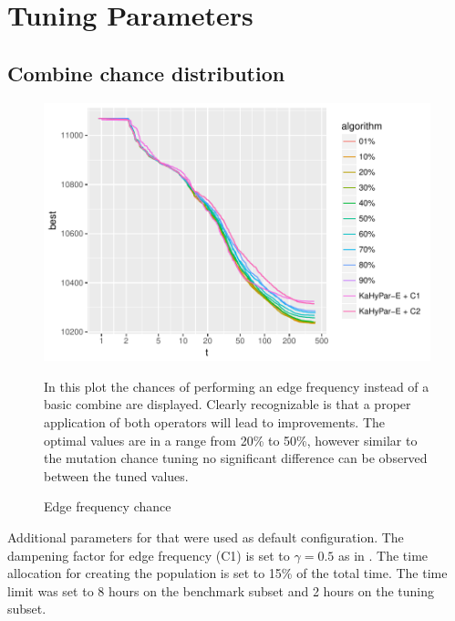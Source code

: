 \documentclass[a4paper,12pt,titlepage, BCOR7mm,headsepline]{scrbook}
\numberwithin{equation}{section}
\begin{document}


\section{Tuning Parameters}

\subsection{Combine chance distribution}
\begin{figure}[H]
\caption{Edge frequency chance}
\begin{center}
\includegraphics{bachelorarbeit-edgefrequencytuning}
\end{center}
In this plot the chances of performing an edge frequency instead of a basic combine are displayed. Clearly recognizable is that a proper application of both operators will lead to improvements. The optimal values are in a range from 20\% to 50\%, however similar to the mutation chance tuning no significant difference can be observed between the tuned values.  
\end{figure}
Additional parameters for that were used as default configuration. The dampening factor for edge frequency (C1) is set to $\gamma = 0.5$ as in \cite{wichlund1998multilevel}. The time allocation for creating the population is set to 15\% of the total time. The time limit was set to 8 hours on the benchmark subset and 2 hours on the tuning subset.
\end{document}
